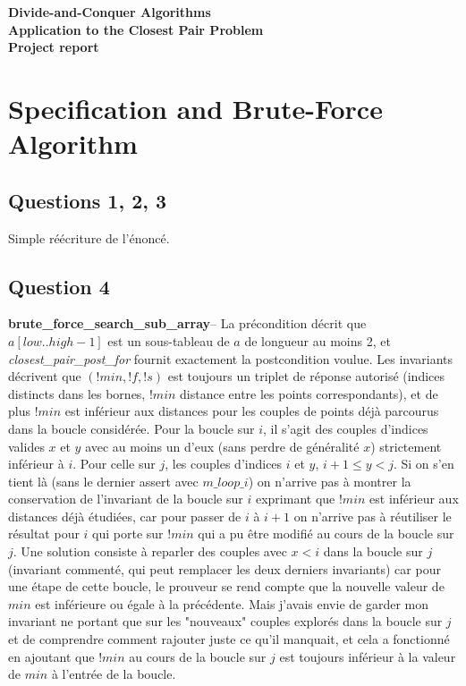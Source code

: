 \documentclass[11pt, openany, titlepage]{article}
\newcommand{\paragraphtitle}[1]{\textbf{#1}\;\;--\;}
\begin{document}
{\centering

\LARGE\textbf{
Divide-and-Conquer Algorithms
\\ %
Application to the Closest Pair Problem
\\ \vspace{1em}
Project report
}

}

\vspace{5em}

\section{Specification and Brute-Force Algorithm}

\subsection{Questions 1, 2, 3}

Simple réécriture de l'énoncé.


\subsection{Question 4}

\paragraphtitle{brute\_force\_search\_sub\_array}
La précondition décrit que ${a[low..high-1]}$ est un sous-tableau de $a$ de longueur au moins 2, et \emph{closest\_pair\_post\_for} fournit exactement la postcondition voulue. Les invariants décrivent que $(!min,!f,!s)$ est toujours un triplet de réponse autorisé (indices distincts dans les bornes, $!min$ distance entre les points correspondants), et de plus $!min$ est inférieur aux distances pour les couples de points déjà parcourus dans la boucle considérée. Pour la boucle sur $i$, il s'agit des couples d'indices valides $x$ et $y$ avec au moins un d'eux (sans perdre de généralité $x$) strictement inférieur à $i$. Pour celle sur $j$, les couples d'indices $i$ et $y$, $i+1\leq y < j$. Si on s'en tient là (sans le dernier assert avec $m\_loop\_i$) on n'arrive pas à montrer la conservation de l'invariant de la boucle sur $i$ exprimant que $!min$ est inférieur aux distances déjà étudiées, car pour passer de $i$ à $i+1$ on n'arrive pas à réutiliser le résultat pour $i$ qui porte sur $!min$ qui a pu être modifié au cours de la boucle sur $j$. Une solution consiste à reparler des couples avec $x<i$ dans la boucle sur $j$ (invariant commenté, qui peut remplacer les deux derniers invariants) car pour une étape de cette boucle, le prouveur se rend compte que la nouvelle valeur de $min$ est inférieure ou égale à la précédente. Mais j'avais envie de garder mon invariant ne portant que sur les "nouveaux" couples explorés dans la boucle sur $j$ et de comprendre comment rajouter juste ce qu'il manquait, et cela a fonctionné en ajoutant que $!min$ au cours de la boucle sur $j$ est toujours inférieur à la valeur de $min$ à l'entrée de la boucle.
\end{document}
